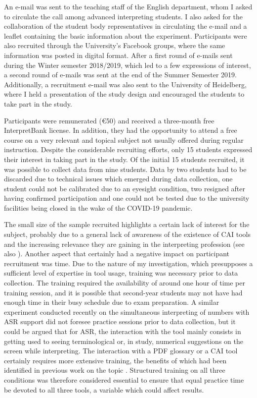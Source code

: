 An e-mail was sent to the teaching staff of the English department, whom I asked to circulate the call among advanced interpreting students. I also asked for the collaboration of the student body representatives in circulating the e-mail and a leaflet containing the basic information about the experiment. Participants were also recruited through the University's Facebook groups, where the same information was posted in digital format. After a first round of e-mails sent during the Winter semester 2018/2019, which led to a few expressions of interest, a second round of e-mails was sent at the end of the Summer Semester 2019. Additionally, a recruitment e-mail was also sent to the University of Heidelberg, where I held a presentation of the study design and encouraged the students to take part in the study.

Participants were remunerated (\euro 50) and received a three-month free InterpretBank license. In addition, they had the opportunity to attend a free course on a very relevant and topical subject not usually offered during regular instruction. Despite the considerable recruiting efforts, only 15 students expressed their interest in taking part in the study. Of the initial 15 students recruited, it was possible to collect data from nine students. Data by two students had to be discarded due to technical issues which emerged during data collection, one student could not be calibrated due to an eyesight condition, two resigned after having confirmed participation and one could not be tested due to the university facilities being closed in the wake of the COVID-19 pandemic.

The small size of the sample recruited highlights a certain lack of interest for the subject, probably due to a general lack of awareness of the existence of CAI tools and the increasing relevance they are gaining in the interpreting profession (see also \citealt{prandi_cai_2020}). Another aspect that certainly had a negative impact on participant recruitment was time. Due to the nature of my investigation, which presupposes a sufficient level of expertise in tool usage, training was necessary prior to data collection. The training required the availability of around one hour of time per training session, and it is possible that second-year students may not have had enough time in their busy schedule due to exam preparation. A similar experiment conducted recently on the simultaneous interpreting of numbers with ASR support \citep{defrancq_automatic_2020} did not foresee practice sessions prior to data collection, but it could be argued that for ASR, the interaction with the tool mainly consists in getting used to seeing terminological or, in  study, numerical suggestions on the screen while interpreting. The interaction with a PDF glossary or a CAI tool certainly requires more extensive training, the benefits of which had been identified in previous work on the topic \citep{prandi_uso_2015, prandi_use_2015}. Structured training on all three conditions was therefore considered essential to ensure that equal practice time be devoted to all three tools, a variable which could affect results.

